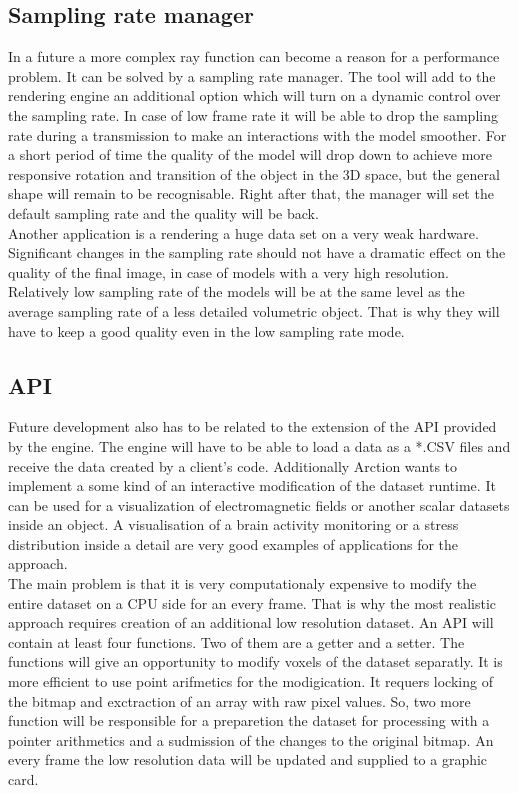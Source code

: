 \documentclass[twoside, english, 11pt]{report}
\begin{document}
\subsection{Sampling rate manager}
 
In a future a more complex ray function can become a reason for a performance problem. It can be solved by a sampling rate manager. The tool will add to the rendering engine an additional option which will turn on a dynamic control over the sampling rate. In case of low frame rate it will be able to drop the sampling rate during a transmission to make an interactions with the model smoother. For a short period of time the quality of the model will drop down to achieve more responsive rotation and transition of the object in the 3D space, but the general shape will remain to be recognisable. Right after that, the manager will set the default sampling rate and the quality will be back.\\

Another application is a rendering a huge data set on a very weak hardware. Significant changes in the sampling rate should not have a dramatic effect on the quality of the final image, in case of models with a very high resolution. Relatively low sampling rate of the models will be at the same level as the average sampling rate of a less detailed volumetric object. That is why they will have to keep a good quality even in the low sampling rate mode.


\subsection{API}

Future development also has to be related to the extension of the API provided by the engine. The engine will have to be able to load a data as a *.CSV files and receive the data created by a client's code. Additionally Arction wants to implement a some kind of an interactive modification of the dataset runtime. It can be used for a visualization of electromagnetic fields or another scalar datasets inside an object. A visualisation of a brain activity monitoring or a stress distribution inside a detail are very good examples of applications for the approach. \\

The main problem is that it is very computationaly expensive to modify the entire dataset on a CPU side for an every frame. That is why the most realistic approach requires creation of an additional low resolution dataset. An API will contain at least four functions. Two of them are a getter and a setter. The functions will give an opportunity to modify voxels of the dataset separatly. It is more efficient to use point arifmetics for the modigication. It requers locking of the bitmap and exctraction of an array with raw pixel values. So, two more function will be responsible for a preparetion the dataset for processing with a pointer arithmetics and a sudmission of the changes to the original bitmap. An every frame the low resolution data will be updated and supplied to a graphic card. \\
\end{document}
